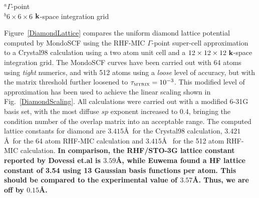 \documentclass[prb,aps,nobibnotes,twocolumn,doublespace,twocolumngrid,superbib]{revtex4}
\begin{document}
\begin{table}[h]
\caption{Lattice Constant for the Diamond System for different 
theory levels and basis sets}
\label{DamondLC}
\raggedright{
{\hskip 0.26in}$^a \Gamma$-point\\
{\hskip 0.26in}$^b 6\times6\times6$ ${\bf k}$-space integration grid \\}
\end{table}


Figure~\ref{DiamondLattice} compares the uniform diamond lattice potential computed 
by MondoSCF using the RHF-MIC $\Gamma$-point super-cell approximation to a {\sc Crystal98}
calculation using a two atom unit cell and a $12 \times 12 \times 12 ~{\bf k}$-space integration grid.
The {\sc MondoSCF} curves have been carried out with 64 atoms using {\it tight}
numerics, and with 512 atoms using a {\it loose} level of accuracy, but with the matrix
threshold further loosened to $\Huge \tau_{\rm \scriptscriptstyle MTRIX}=10^{-3}$. 
This modified level of approximation has been used to achieve the linear scaling shown 
in Fig.~\ref{DiamondScaling}. All calculations were carried out with a modified 6-31G basis set, 
with the most diffuse $sp$ exponent increased to 0.4, bringing the condition number 
of the overlap matrix into an acceptable range.  The computed lattice constants 
for diamond are $3.415$\AA~for the {\sc Crystal98} calculation, $3.421$\AA~for 
the 64 atom RHF-MIC calculation and $3.415$\AA~ for the 512 atom RHF-MIC calculation.
{\bf In comparison, the RHF/STO-3G lattice constant reported by Dovessi et.al \cite{RDovesi80b} 
is $3.59$\AA, while Euwema \cite{REuwema73} found a HF lattice constant of 3.54 using 13 
Gaussian basis functions per atom.  This should be compared to the experimental value of $3.57$\AA.
Thus, we are off by $0.15$\AA. }
\end{document}
